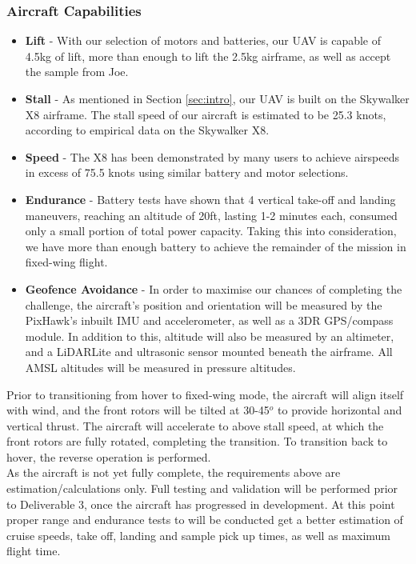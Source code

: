 \subsubsection{Aircraft Capabilities}
\begin{itemize}
	\item \textbf{Lift} - With our selection of motors and batteries, our UAV is capable of 4.5kg of lift, more than enough to lift the 2.5kg airframe, as well as accept the sample from Joe.
	\item \textbf{Stall} - As mentioned in Section \ref{sec:intro}, our UAV is built on the Skywalker X8 airframe. The stall speed of our aircraft is estimated to be 25.3 knots, according to empirical data on the Skywalker X8.
	\item \textbf{Speed} - The X8 has been demonstrated by many users to achieve airspeeds in excess of 75.5 knots using similar battery and motor selections.
	\item \textbf{Endurance} - Battery tests have shown that 4 vertical take-off and landing maneuvers, reaching an altitude of 20ft, lasting 1-2 minutes each, consumed only a small portion of total power capacity. Taking this into consideration, we have more than enough battery to achieve the remainder of the mission in fixed-wing flight.
	\item \textbf{Geofence Avoidance} - In order to maximise our chances of completing the challenge, the aircraft's position and orientation will be measured by the PixHawk's inbuilt IMU and accelerometer, as well as a 3DR GPS/compass module. In addition to this, altitude will also be measured by an altimeter, and a LiDARLite and ultrasonic sensor mounted beneath the airframe. All AMSL altitudes will be measured in pressure altitudes.
\end{itemize}

Prior to transitioning from hover to fixed-wing mode, the aircraft will align itself with wind, and the front rotors will be tilted at 30-45$^o$ to provide horizontal and vertical thrust. The aircraft will accelerate to above stall speed, at which the front rotors are fully rotated, completing the transition. To transition back to hover, the reverse operation is performed.\\

As the aircraft is not yet fully complete, the requirements above are estimation/calculations only. Full testing and validation will be performed prior to Deliverable 3, once the aircraft has progressed in development. At this point proper range and endurance tests to will be conducted get a better estimation of cruise speeds, take off, landing and sample pick up times, as well as maximum flight time.

